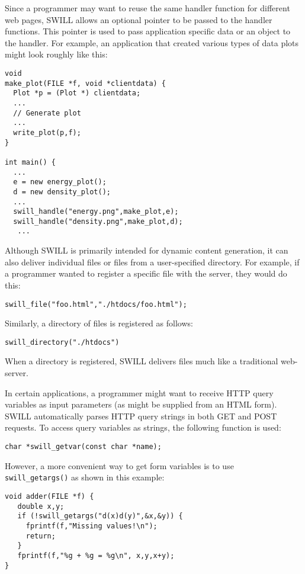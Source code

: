 Since a programmer may want to reuse the same handler function for different web pages, SWILL allows an
optional pointer to be passed to the handler functions.  This pointer is used to pass
application specific data or an object to the handler.  For example, an application that created
various types of data plots might look roughly like this:

\begin{verbatim}
void
make_plot(FILE *f, void *clientdata) {
  Plot *p = (Plot *) clientdata;
  ...
  // Generate plot
  ...
  write_plot(p,f);
}

int main() {
  ...
  e = new energy_plot();
  d = new density_plot();
  ...
  swill_handle("energy.png",make_plot,e);
  swill_handle("density.png",make_plot,d);
   ...
\end{verbatim}

Although SWILL is primarily intended for dynamic content generation, 
it can also deliver individual files or files from a user-specified 
directory. For example, if a programmer wanted to register a specific 
file with the server, they would do this:

\begin{verbatim}
swill_file("foo.html","./htdocs/foo.html");
\end{verbatim}

\noindent
Similarly, a directory of files is registered as follows:

\begin{verbatim}
swill_directory("./htdocs")
\end{verbatim}

\noindent
When a directory is registered, SWILL delivers files much like a
traditional web-server.

In certain applications, a programmer might want to receive HTTP query
variables as input parameters (as might be supplied from an HTML
form).  SWILL automatically parses HTTP query strings in both GET and
POST requests.  To access query variables as strings, the following
function is used:

\begin{verbatim}
char *swill_getvar(const char *name);
\end{verbatim}

\noindent
However, a more convenient way to get form variables is to use {\tt
swill\_getargs()} as shown in this example:

\begin{verbatim}
void adder(FILE *f) {
   double x,y;
   if (!swill_getargs("d(x)d(y)",&x,&y)) {
     fprintf(f,"Missing values!\n");
     return;
   }
   fprintf(f,"%g + %g = %g\n", x,y,x+y);
}
\end{verbatim}

